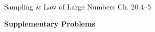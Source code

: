 \documentclass[handout]{mcs}
\begin{document}

\begin{staffnotes}
Sampling \& Law of Large Numbers Ch. 20.4--5
\end{staffnotes}







\begin{center}
\textbf{Supplementary Problems}
\end{center}



\end{document}
